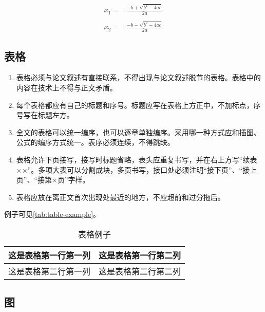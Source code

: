 \begin{equation}
    \label{eq:example-formulas2}
    \begin{split}
    x_1 = & \frac{-b+\sqrt{b^2-4ac}}{2a} \\
     & \\
    x_2 = & \frac{-b-\sqrt{b^2-4ac}}{2a}
    \end{split}
\end{equation}

\subsection{表格}

\begin{enumerate}
    \item 表格必须与论文叙述有直接联系，不得出现与论文叙述脱节的表格。表格中的内容在技术上不得与正文矛盾。
    \item 每个表格都应有自己的标题和序号。标题应写在表格上方正中，不加标点，序号写在标题左方。
    \item 全文的表格可以统一编序，也可以逐章单独编序。采用哪一种方式应和插图、公式的编序方式统一。表序必须连续，不得跳缺。
    \item 表格允许下页接写，接写时标题省略，表头应重复书写，并在右上方写``续表××''。多项大表可以分割成块，多页书写，接口处必须注明``接下页''、``接上页''、``接第×页''字样。
    \item 表格应放在离正文首次出现处最近的地方，不应超前和过分拖后。
\end{enumerate}


例子可见\autoref{tab:table-example}。

\begin{table}[!htbp]
    \centering
    \caption{表格例子}
    \label{tab:table-example}
    \begin{tabular}{|l|l|}
    \hline
    \multicolumn{1}{|c|}{这是表格第一行第一列} & 这是表格第一行第二列 \\ \hline
    这是表格第二行第一列                       & 这是表格第二行第二列 \\ \hline
    \end{tabular}
\end{table}

\subsection{图}


